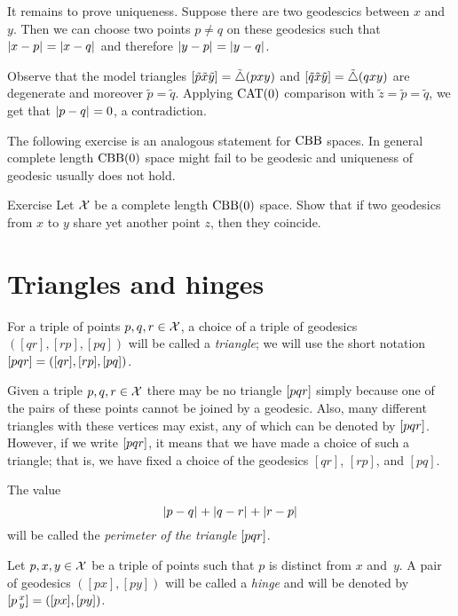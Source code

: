 It remains to prove uniqueness.
Suppose there are two geodescics between $x$ and $y$.
Then we can choose two points $p\ne q$ on these geodesics such that $\dist{x}{p}{}=\dist{x}{q}{}$ and therefore $\dist{y}{p}{}=\dist{y}{q}{}$.

Observe that the model triangles $[\tilde p\tilde x\tilde y]=\tilde\triangle(pxy)$ and $[\tilde q\tilde x\tilde y]\z=\modtrig(qxy)$ are degenerate and moreover $\tilde p=\tilde q$.
Applying $\mathrm{CAT}(0)$ comparison with $\tilde z=\tilde p=\tilde q$,
we get that $\dist{p}{q}{}=0$, a contradiction.
\qeds

The following exercise is an analogous statement for $\mathrm{CBB}$ spaces.
In general complete length $\mathrm{CBB}(0)$ space might fail to be geodesic
and uniqueness of geodesic usually does not hold.

\begin{thm}{Exercise}\label{ex:CBB-geodesic}
Let $\mathcal{X}$ be a complete length $\mathrm{CBB}(0)$ space.
Show that if two geodesics from $x$ to $y$ share yet another point $z$,
then they coincide.
\end{thm}

\section{Triangles and hinges}


For a triple of points $p,q,r\in \mathcal{X}$, a choice of a triple of geodesics $([q r], [r p], [p q])$ will be called a \emph{triangle}; we will use the short notation 
$[pqr]=([q r], [r p], [p q])$\index{$\trig {{*}}{{*}}{{*}}$}.

Given a triple $p,q,r\in \mathcal{X}$ there may be no triangle 
$[pqr]$ simply because one of the pairs of these points cannot be joined by a geodesic.
Also, many different triangles with these vertices may exist, any of which can be denoted by $[pqr]$.
However, if we write $[pqr]$, it means that we have made a choice of such a triangle; 
that is, we have  fixed a choice of the geodesics $[q r]$, $[r p]$, and $[p q]$.

The value 
\[\dist{p}{q}{}+\dist{q}{r}{}+\dist{r}{p}{}\]
will be called the {}\emph{perimeter of the triangle} $[pqr]$.

Let $p,x,y\in \mathcal{X}$ be a triple of points such that $p$ is distinct from $x$ and~$y$.
A pair of geodesics $([p x],[p y])$ will be called  a \emph{hinge} and will be denoted by 
$[p\,{}^{x}_{y}]=([p x],[p y])$\index{$\hinge{{*}}{{*}}{{*}}$}.

